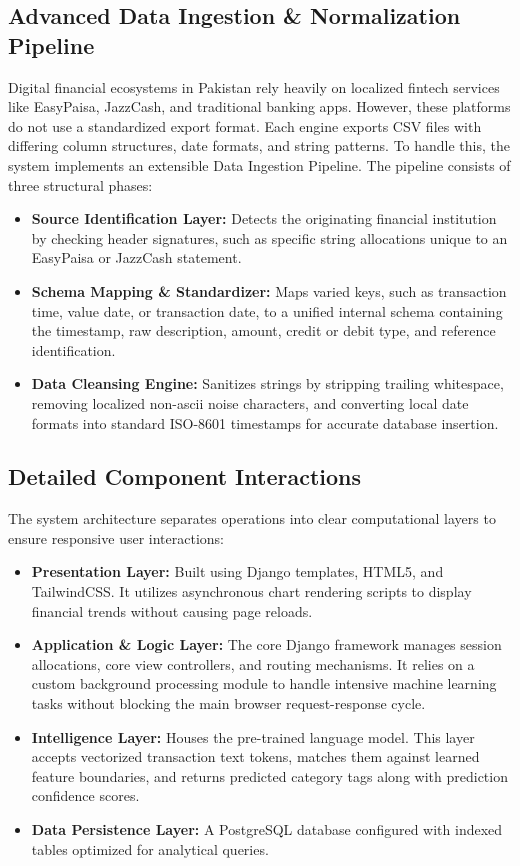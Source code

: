 \subsection{Advanced Data Ingestion \& Normalization Pipeline}
Digital financial ecosystems in Pakistan rely heavily on localized fintech services like EasyPaisa, JazzCash, and traditional banking apps. However, these platforms do not use a standardized export format. Each engine exports CSV files with differing column structures, date formats, and string patterns. To handle this, the system implements an extensible Data Ingestion Pipeline. The pipeline consists of three structural phases:
\begin{itemize}
	\item \textbf{Source Identification Layer:} Detects the originating financial institution by checking header signatures, such as specific string allocations unique to an EasyPaisa or JazzCash statement.
	\item \textbf{Schema Mapping \& Standardizer:} Maps varied keys, such as transaction time, value date, or transaction date, to a unified internal schema containing the timestamp, raw description, amount, credit or debit type, and reference identification.
	\item \textbf{Data Cleansing Engine:} Sanitizes strings by stripping trailing whitespace, removing localized non-ascii noise characters, and converting local date formats into standard ISO-8601 timestamps for accurate database insertion.
\end{itemize}

\subsection{Detailed Component Interactions}
The system architecture separates operations into clear computational layers to ensure responsive user interactions:
\begin{itemize}
	\item \textbf{Presentation Layer:} Built using Django templates, HTML5, and TailwindCSS. It utilizes asynchronous chart rendering scripts to display financial trends without causing page reloads.
	\item \textbf{Application \& Logic Layer:} The core Django framework manages session allocations, core view controllers, and routing mechanisms. It relies on a custom background processing module to handle intensive machine learning tasks without blocking the main browser request-response cycle.
	\item \textbf{Intelligence Layer:} Houses the pre-trained language model. This layer accepts vectorized transaction text tokens, matches them against learned feature boundaries, and returns predicted category tags along with prediction confidence scores.
	\item \textbf{Data Persistence Layer:} A PostgreSQL database configured with indexed tables optimized for analytical queries.
\end{itemize}

